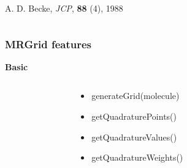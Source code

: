 \begin{frame}
\begin{columns}
\begin{column}{0.7\linewidth}
    \vspace{1mm}

    \scriptsize
    A. D. Becke, 
    {\it JCP}, \textbf{88} (4), 1988

    \end{column}
    \end{columns}
\end{frame}

\begin{frame}
    \frametitle{MRGrid features}
    \hspace{45mm} \textbf{Basic}
    \begin{columns}
    \begin{column}{0.3\linewidth}
    \end{column}
    \begin{column}{0.5\linewidth}
    \begin{itemize}
        \item generateGrid(molecule)
        \item getQuadraturePoints()
        \item getQuadratureValues()
        \item getQuadratureWeights()
    \end{itemize}
    \end{column}
    \begin{column}{0.2\linewidth}
    \end{column}
    \end{columns}

    \vspace{15mm}


\end{frame}
